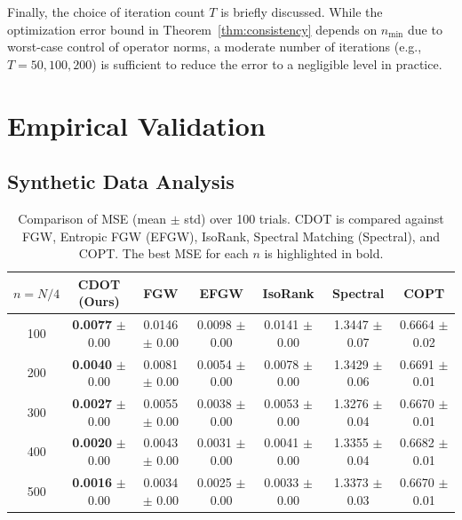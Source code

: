 \documentclass{article}
\theoremstyle{plain}
\theoremstyle{definition}
\theoremstyle{remark}
\begin{document}
Finally, the choice of iteration count $T$ is briefly discussed. While the optimization error bound in Theorem~\ref{thm:consistency} depends on $n_{\min}$ due to worst-case control of operator norms, a moderate number of iterations (e.g., $T=50,100,200$) is sufficient to reduce the error to a negligible level in practice.

\section{Empirical Validation}\label{sec:Empirical}

\subsection{Synthetic Data Analysis}\label{sec:Synthetic}
\begin{table}[t]
	\centering
	\setlength{\tabcolsep}{7.2pt}
	\caption{Comparison of MSE (mean $\pm$ std) over 100 trials. CDOT is compared against FGW, Entropic FGW (EFGW), IsoRank, Spectral Matching (Spectral), and COPT. The best MSE for each $n$ is highlighted in bold.}
\label{tab:simulation-results}
\renewcommand{\arraystretch}{1.15}
\begin{tabular}{ccccccc}
	\toprule
	$n = N/4$
	& \textbf{CDOT (Ours)}
	& \textbf{FGW}
	& \textbf{EFGW}
	& \textbf{IsoRank}
	& \textbf{Spectral}
	& \textbf{COPT} \\
	\midrule
	100 & \textbf{0.0077} $\pm$ 0.00 & 0.0146 $\pm$ 0.00 & 0.0098 $\pm$ 0.00 & 0.0141 $\pm$ 0.00 & 1.3447 $\pm$ 0.07 & 0.6664 $\pm$ 0.02 \\
	200 & \textbf{0.0040} $\pm$ 0.00 & 0.0081 $\pm$ 0.00 & 0.0054 $\pm$ 0.00 & 0.0078 $\pm$ 0.00 & 1.3429 $\pm$ 0.06 & 0.6691 $\pm$ 0.01 \\
	300 & \textbf{0.0027} $\pm$ 0.00 & 0.0055 $\pm$ 0.00 & 0.0038 $\pm$ 0.00 & 0.0053 $\pm$ 0.00 & 1.3276 $\pm$ 0.04 & 0.6670 $\pm$ 0.01 \\
	400 & \textbf{0.0020} $\pm$ 0.00 & 0.0043 $\pm$ 0.00 & 0.0031 $\pm$ 0.00 & 0.0041 $\pm$ 0.00 & 1.3355 $\pm$ 0.04 & 0.6682 $\pm$ 0.01 \\
	500 & \textbf{0.0016} $\pm$ 0.00 & 0.0034 $\pm$ 0.00 & 0.0025 $\pm$ 0.00 & 0.0033 $\pm$ 0.00 & 1.3373 $\pm$ 0.03 & 0.6670 $\pm$ 0.01 \\
	\bottomrule
\end{tabular}\vspace{-4mm}
\end{table}
\end{document}
